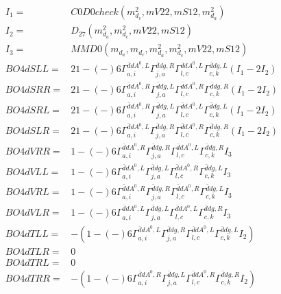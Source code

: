 \documentclass[A4,landscape]{article}
\begin{document}
\begin{align} 
I_1 = & C0D0check(m^2_{d_{{c}}}, mV22, mS12, m^2_{d_{{a}}}) \\ 
I_2 = & D_{27}(m^2_{d_{{a}}}, m^2_{d_{{c}}}, mV22, mS12) \\ 
I_3 = & MMD0(m_{d_{{a}}}, m_{d_{{c}}}, m^2_{d_{{a}}}, m^2_{d_{{c}}}, mV22, mS12) \\ 
  BO4dSLL= & 2   1
-(-)
  6 \Gamma^{\bar{d}d A^0 ,L}_{a, i} \Gamma^{\bar{d}d g ,R}_{j, a} \Gamma^{\bar{d}d A^0 ,L}_{l, c} \Gamma^{\bar{d}d g ,L}_{c, k} (I_1 - 2 I_2) \\ 
  BO4dSRR= & 2   1
-(-)
  6 \Gamma^{\bar{d}d A^0 ,R}_{a, i} \Gamma^{\bar{d}d g ,L}_{j, a} \Gamma^{\bar{d}d A^0 ,R}_{l, c} \Gamma^{\bar{d}d g ,R}_{c, k} (I_1 - 2 I_2) \\ 
  BO4dSRL= & 2   1
-(-)
  6 \Gamma^{\bar{d}d A^0 ,R}_{a, i} \Gamma^{\bar{d}d g ,L}_{j, a} \Gamma^{\bar{d}d A^0 ,L}_{l, c} \Gamma^{\bar{d}d g ,L}_{c, k} (I_1 - 2 I_2) \\ 
  BO4dSLR= & 2   1
-(-)
  6 \Gamma^{\bar{d}d A^0 ,L}_{a, i} \Gamma^{\bar{d}d g ,R}_{j, a} \Gamma^{\bar{d}d A^0 ,R}_{l, c} \Gamma^{\bar{d}d g ,R}_{c, k} (I_1 - 2 I_2) \\ 
  BO4dVRR= &   1
-(-)
  6 \Gamma^{\bar{d}d A^0 ,R}_{a, i} \Gamma^{\bar{d}d g ,R}_{j, a} \Gamma^{\bar{d}d A^0 ,L}_{l, c} \Gamma^{\bar{d}d g ,R}_{c, k} I_3 \\ 
  BO4dVLL= &   1
-(-)
  6 \Gamma^{\bar{d}d A^0 ,L}_{a, i} \Gamma^{\bar{d}d g ,L}_{j, a} \Gamma^{\bar{d}d A^0 ,R}_{l, c} \Gamma^{\bar{d}d g ,L}_{c, k} I_3 \\ 
  BO4dVRL= &   1
-(-)
  6 \Gamma^{\bar{d}d A^0 ,R}_{a, i} \Gamma^{\bar{d}d g ,R}_{j, a} \Gamma^{\bar{d}d A^0 ,R}_{l, c} \Gamma^{\bar{d}d g ,L}_{c, k} I_3 \\ 
  BO4dVLR= &   1
-(-)
  6 \Gamma^{\bar{d}d A^0 ,L}_{a, i} \Gamma^{\bar{d}d g ,L}_{j, a} \Gamma^{\bar{d}d A^0 ,L}_{l, c} \Gamma^{\bar{d}d g ,R}_{c, k} I_3 \\ 
  BO4dTLL= & -(  1
-(-)
  6 \Gamma^{\bar{d}d A^0 ,L}_{a, i} \Gamma^{\bar{d}d g ,R}_{j, a} \Gamma^{\bar{d}d A^0 ,L}_{l, c} \Gamma^{\bar{d}d g ,L}_{c, k} I_2) \\ 
  BO4dTLR= & 0 \\ 
  BO4dTRL= & 0 \\ 
  BO4dTRR= & -(  1
-(-)
  6 \Gamma^{\bar{d}d A^0 ,R}_{a, i} \Gamma^{\bar{d}d g ,L}_{j, a} \Gamma^{\bar{d}d A^0 ,R}_{l, c} \Gamma^{\bar{d}d g ,R}_{c, k} I_2) \\ 
\end{align} 
\end{document}
